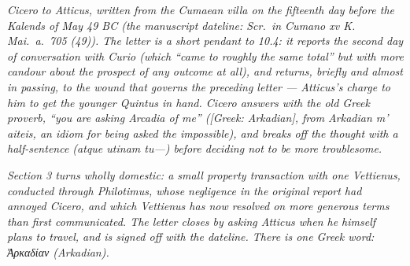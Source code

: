 
\textit{Cicero to Atticus, written from the Cumaean villa
on the fifteenth day before the Kalends of May 49 BC (the
manuscript dateline: \textit{Scr.\ in Cumano xv K. Mai.\
a.\ 705 (49)}). The letter is a short pendant to 10.4: it
reports the second day of conversation with Curio
(which ``came to roughly the same total'' but with more
candour about the prospect of any outcome at all), and
returns, briefly and almost in passing, to the wound that
governs the preceding letter --- Atticus's charge to him to
get the younger Quintus in hand. Cicero answers with the
old Greek proverb, ``you are asking Arcadia of me''
(\textit{[Greek: Arkadian]}, from \textit{Arkadian m'
aiteis}, an idiom for being asked the impossible), and
breaks off the thought with a half-sentence (\textit{atque
utinam tu---}) before deciding not to be more troublesome.}

\textit{Section 3 turns wholly domestic: a small property
transaction with one Vettienus, conducted through
Philotimus, whose negligence in the original report had
annoyed Cicero, and which Vettienus has now resolved on
more generous terms than first communicated. The letter
closes by asking Atticus when he himself plans to travel,
and is signed off with the dateline. There is one Greek
word: \textit{Ἀρκαδίαν} (\textit{Arkadian}).}
